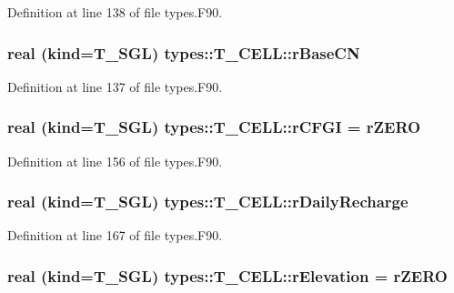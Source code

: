 Definition at line 138 of file types.F90.

\hypertarget{typetypes_1_1_t___c_e_l_l_a7410573cf8d106abd2302cfba636cbbf}{
\subsubsection[{rBaseCN}]{\setlength{\rightskip}{0pt plus 5cm}real (kind={\bf T\_\-SGL}) {\bf types::T\_\-CELL::rBaseCN}}}
\label{typetypes_1_1_t___c_e_l_l_a7410573cf8d106abd2302cfba636cbbf}


Definition at line 137 of file types.F90.

\hypertarget{typetypes_1_1_t___c_e_l_l_a6962c484fb07691a4b4d956b39e06b85}{
\subsubsection[{rCFGI}]{\setlength{\rightskip}{0pt plus 5cm}real (kind={\bf T\_\-SGL}) {\bf types::T\_\-CELL::rCFGI} = {\bf rZERO}}}
\label{typetypes_1_1_t___c_e_l_l_a6962c484fb07691a4b4d956b39e06b85}


Definition at line 156 of file types.F90.

\hypertarget{typetypes_1_1_t___c_e_l_l_a9802fdd87665399c3dfd67aaf5a6ca05}{
\subsubsection[{rDailyRecharge}]{\setlength{\rightskip}{0pt plus 5cm}real (kind={\bf T\_\-SGL}) {\bf types::T\_\-CELL::rDailyRecharge}}}
\label{typetypes_1_1_t___c_e_l_l_a9802fdd87665399c3dfd67aaf5a6ca05}


Definition at line 167 of file types.F90.

\hypertarget{typetypes_1_1_t___c_e_l_l_aba783c11adf88985c9c541234f2f7a72}{
\subsubsection[{rElevation}]{\setlength{\rightskip}{0pt plus 5cm}real (kind={\bf T\_\-SGL}) {\bf types::T\_\-CELL::rElevation} = {\bf rZERO}}}
\label{typetypes_1_1_t___c_e_l_l_aba783c11adf88985c9c541234f2f7a72}



